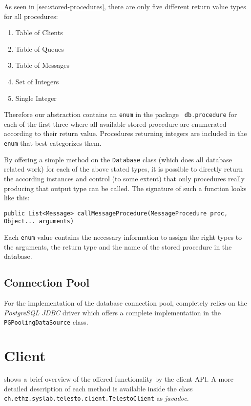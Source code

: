 \documentclass[a4paper, oneside]{csthesis}
\begin{document}
    As seen in \cref{sec:stored-procedures}, there are only five different
    return value types for all procedures:
    
    \begin{enumerate}
        \item Table of Clients
        \item Table of Queues
        \item Table of Messages
        \item Set of Integers
        \item Single Integer
    \end{enumerate}
    
    Therefore our abstraction contains an {\tt enum} in the package {\tt
    db.procedure} for each of the first three where all available stored
    procedure are enumerated according to their return value. Procedures
    returning integers are included in the {\tt enum} that best categorizes
    them.
    
    By offering a simple method on the {\tt Database} class (which does all
    database related work) for each of the above stated types, it is possible to
    directly return the according instances and control (to some extent) that
    only procedures really producing that output type can be called. The
    signature of such a function looks like this:
    
    \begin{center}
        {\tt public List<Message> callMessageProcedure(MessageProcedure proc,
        Object... arguments)}
    \end{center}

    Each {\tt enum} value contains the necessary information to assign the
    right types to the arguments, the return type and the name of the stored
    procedure in the database.
    
\subsection{Connection Pool}
    For the implementation of the database connection pool, \telesto{}
    completely relies on the {\it PostgreSQL JDBC} driver which
    offers a complete implementation in the {\tt
    PGPoolingDataSource}
    class.


\section{Client}
     shows a brief overview of the offered
    functionality by the \telesto{} client API. A more detailed description of
    each method is available inside the class {\tt
    ch.ethz.syslab.telesto.client.TelestoClient} as {\it
    javadoc}.
    
\end{document}
